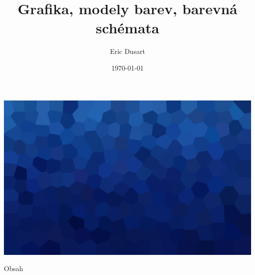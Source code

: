 \documentclass[aspectratio=169,xcolor=dvipsnames, t]{beamer}
\title[]{Grafika, modely barev, barevná schémata} %
\subtitle{}
\author[Dusart]{Eric Dusart}
\institute[GEVO]{Gymnázium Evolution Jižní Město}
\date{\today}
\begin{document}
\maketitlepage
{
{
    \includegraphics[width=\paperwidth,height=\paperheight]{AICStyleData/logos/mene_polygonu_bg.png}
}
\begin{frame}[t]{Obsah}
    \tableofcontents
\end{frame}
}
\end{document}
